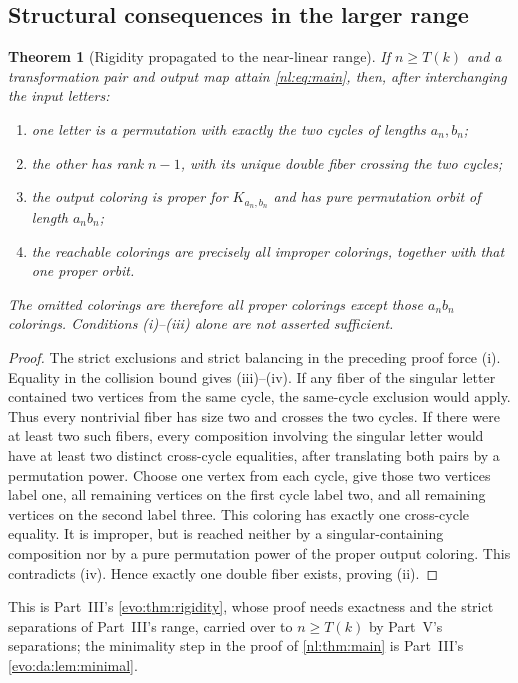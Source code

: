 \documentclass[11pt,a4paper]{article}
\numberwithin{equation}{section}
\newtheorem{theorem}{Theorem}[section]
\theoremstyle{definition}
\theoremstyle{remark}
\begin{document}
\subsection{Structural consequences in the larger range}
\begin{theorem}[Rigidity propagated to the near-linear range]\label{nl:thm:rigidity}
If $n\ge T(k)$ and a transformation pair and output map attain
\eqref{nl:eq:main}, then, after interchanging the input letters:
\begin{enumerate}[label=(\roman*)]
\item one letter is a permutation with exactly the two cycles
of lengths $a_n,b_n$;
\item the other has rank $n-1$, with its unique double fiber crossing
the two cycles;
\item the output coloring is proper for $K_{a_n,b_n}$ and has pure
permutation orbit of length $a_nb_n$;
\item the reachable colorings are precisely all improper colorings,
together with that one proper orbit.
\end{enumerate}
The omitted colorings are therefore all proper colorings except those
$a_nb_n$ colorings. Conditions (i)--(iii) alone are not asserted sufficient.
\end{theorem}
\begin{proof}
The strict exclusions and strict balancing in the preceding proof force
(i). Equality in the collision bound gives (iii)--(iv).
If any fiber of the singular letter contained two vertices from the same
cycle, the same-cycle exclusion would apply. Thus every nontrivial fiber
has size two and crosses the two cycles. If there were at least two such
fibers, every composition involving the singular letter would have at
least two distinct cross-cycle equalities, after translating both pairs
by a permutation power. Choose one vertex from each cycle, give those
two vertices label one, all remaining vertices on the first cycle label
two, and all remaining vertices on the second label three. This coloring
has exactly one cross-cycle equality. It is improper, but is reached
neither by a singular-containing composition nor by a pure permutation
power of the proper output coloring. This contradicts (iv). Hence exactly
one double fiber exists, proving (ii).
\end{proof}

This is Part~III's \cref{evo:thm:rigidity}, whose proof needs exactness and
the strict separations of Part~III's range, carried over to $n\ge T(k)$ by
Part~V's separations; the minimality step in the proof of \cref{nl:thm:main}
is Part~III's \cref{evo:da:lem:minimal}.
\end{document}
